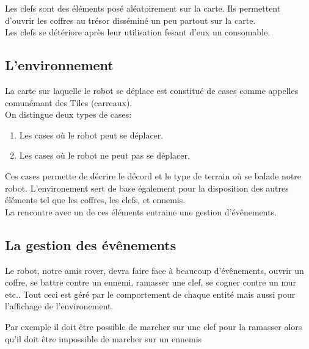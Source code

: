 \documentclass[a4paper 12pts]{article}
\begin{document}
\vspace{0.75cm}

Les clefs sont des éléments posé aléatoirement sur la carte. Ils permettent d'ouvrir les coffres au trésor disséminé un peu partout sur la carte.\\
Les clefs se détériore après leur utilisation fesant d'eux un consomable.


\vspace{0.75cm}


\subsection{L'environnement}


\vspace{0.75cm}

La carte sur laquelle le robot se déplace est constitué de cases comme appelles comunémant des Tiles (carreaux). \\
On distingue deux types de cases:

\begin{enumerate}
	\item Les cases où le robot peut se déplacer.
	\item Les cases où le robot ne peut pas se déplacer.
\end{enumerate}

Ces cases permette de décrire le décord et le type de terrain où se balade notre robot.
L'environement sert de base également pour la disposition des autres éléments tel que les coffres, les clefs, et ennemis.\\
La rencontre avec un de ces éléments entraine une gestion d'évênements.

\newpage
\subsection{La gestion des évênements}


\vspace{0.75cm}
Le robot, notre amis rover, devra faire face à beaucoup d'évênements, ouvrir un coffre, se battre contre un ennemi, ramasser une clef, se cogner contre un mur etc..
Tout ceci est géré par le comportement de chaque entité mais aussi pour l'affichage de l'environement.

Par exemple il doit être possible de marcher sur une clef pour la ramasser alors qu'il doit être impossible de marcher sur un ennemis

\vspace{0.75cm}
\end{document}
